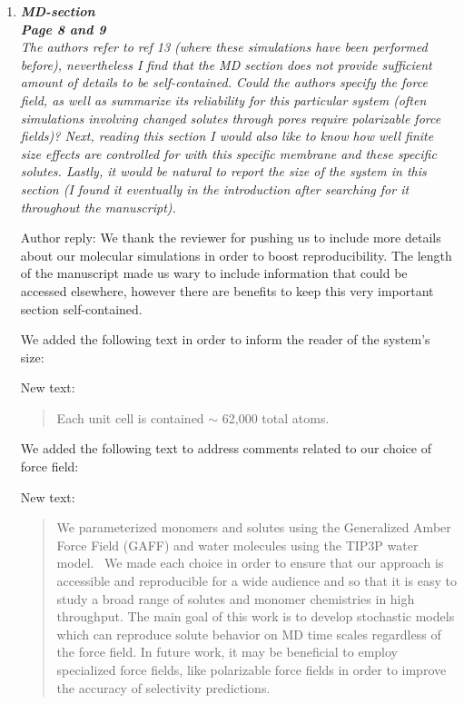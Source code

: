 \documentclass{article}
\begin{document}
\begin{enumerate}[label={Comment \theenumi :}, leftmargin=3.9\parindent]
  \item \textit{\textbf{MD-section} \\
        \textbf{Page 8 and 9} \\
        The authors refer to ref 13 (where these simulations have been performed before), 
        nevertheless I find that the MD section does not provide sufficient amount of details 
        to be self-contained. Could the authors specify the force field, as well as summarize 
        its reliability for this particular system (often simulations involving changed solutes
        through pores require polarizable force fields)? Next, reading this section I would 
        also like to know how well finite size effects are controlled for with this specific 
        membrane and these specific solutes. Lastly, it would be natural to report the size 
        of the system in this section (I found it eventually in the introduction after 
        searching for it throughout the manuscript).}

  Author reply: We thank the reviewer for pushing us to include more details about our 
  molecular simulations in order to boost reproducibility. The length of the manuscript made
  us wary to include information that could be accessed elsewhere, however there are 
  benefits to keep this very important section self-contained.
  
  We added the following text in order to inform the reader of the system's size:
  
  New text:
  \begin{quote}
  Each unit cell is contained $\sim$ 62,000 total atoms. %
  \end{quote}
  
  We added the following text to address comments related to our choice of force field:
  
  New text:
  \begin{quote}
  We parameterized monomers and solutes using the Generalized Amber Force Field (GAFF) and
  water molecules using the TIP3P water model.~\cite{} We made each choice in order to
  ensure that our approach is accessible and reproducible for a wide audience and so that
  it is easy to study a broad range of solutes and monomer chemistries in high throughput. 
  The main goal of this work is to develop stochastic models which can reproduce solute
  behavior on MD time scales regardless of the force field. In future work, it may be 
  beneficial to employ specialized force fields, like polarizable force fields in 
  order to improve the accuracy of selectivity predictions.
  \end{quote}
  

\end{enumerate}
\end{document}
